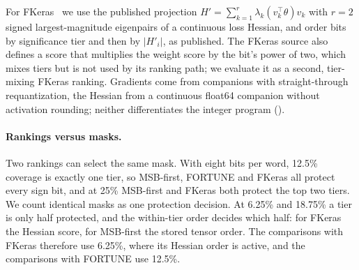 For FKeras~\cite{weng2024fkeras} we use the published projection $H'=\sum_{k=1}^{r}\lambda_k(v_k^\top\theta)v_k$ with $r=2$ signed largest-magnitude eigenpairs of a continuous loss Hessian, and order bits by significance tier and then by $|H'_i|$, as published. The FKeras source also defines a score that multiplies the weight score by the bit's power of two, which mixes tiers but is not used by its ranking path; we evaluate it as a second, tier-mixing FKeras ranking. Gradients come from companions with straight-through requantization, the Hessian from a continuous float64 companion without activation rounding; neither differentiates the integer program ().

\paragraph{Rankings versus masks.} Two rankings can select the same mask. With eight bits per word, 12.5\% coverage is exactly one tier, so MSB-first, FORTUNE and FKeras all protect every sign bit, and at 25\% MSB-first and FKeras both protect the top two tiers. We count identical masks as one protection decision. At 6.25\% and 18.75\% a tier is only half protected, and the within-tier order decides which half: for FKeras the Hessian score, for MSB-first the stored tensor order. The comparisons with FKeras therefore use 6.25\%, where its Hessian order is active, and the comparisons with FORTUNE use 12.5\%.

